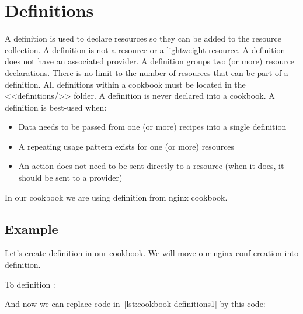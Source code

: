 \section{Definitions}

A definition is used to declare resources so they can be added to the resource collection. A definition is not a resource or a lightweight resource. A definition does not have an associated provider. A definition groups two (or more) resource declarations. There is no limit to the number of resources that can be part of a definition. All definitions within a cookbook must be located in the <<definitions/>> folder. A definition is never declared into a cookbook. A definition is best-used when:

\begin{itemize}
  \item Data needs to be passed from one (or more) recipes into a single definition
  \item A repeating usage pattern exists for one (or more) resources
  \item An action does not need to be sent directly to a resource (when it does, it should be sent to a provider)
\end{itemize}

In our  cookbook we are using  definition from nginx cookbook.

\subsection{Example}

Let's create definition in our  cookbook. We will move our nginx conf creation into definition.



To definition :



And now we can replace code in~\ref{lst:cookbook-definitions1} by this code:



